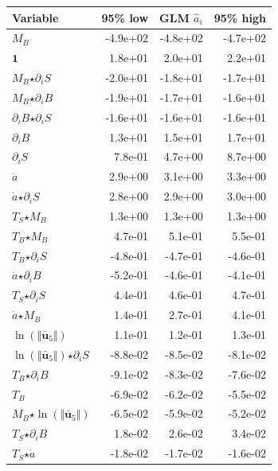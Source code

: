 
\begin{table}[H]
\centering
\begin{tabular}{l|r|r|r}
  \textbf{Variable} & \textbf{95\% low} & \textbf{GLM} $\hat{a}_i$ & \textbf{95\% high} \\
  \hline
  $M_B$ & -4.9e+02 & -4.8e+02 & -4.7e+02 \\
  $\mathbf{1}$ & 1.8e+01 & 2.0e+01 & 2.2e+01 \\
  $M_B$$ \star $$\partial_i S$ & -2.0e+01 & -1.8e+01 & -1.7e+01 \\
  $M_B$$ \star $$\partial_i B$ & -1.9e+01 & -1.7e+01 & -1.6e+01 \\
  $\partial_i B$$ \star $$\partial_i S$ & -1.6e+01 & -1.6e+01 & -1.6e+01 \\
  $\partial_i B$ & 1.3e+01 & 1.5e+01 & 1.7e+01 \\
  $\partial_i S$ & 7.8e-01 & 4.7e+00 & 8.7e+00 \\
  $\dot{a}$ & 2.9e+00 & 3.1e+00 & 3.3e+00 \\
  $\dot{a}$$ \star $$\partial_i S$ & 2.8e+00 & 2.9e+00 & 3.0e+00 \\
  $T_S$$ \star $$M_B$ & 1.3e+00 & 1.3e+00 & 1.3e+00 \\
  $T_B$$ \star $$M_B$ & 4.7e-01 & 5.1e-01 & 5.5e-01 \\
  $T_B$$ \star $$\partial_i S$ & -4.8e-01 & -4.7e-01 & -4.6e-01 \\
  $\dot{a}$$ \star $$\partial_i B$ & -5.2e-01 & -4.6e-01 & -4.1e-01 \\
  $T_S$$ \star $$\partial_i S$ & 4.4e-01 & 4.6e-01 & 4.7e-01 \\
  $\dot{a}$$ \star $$M_B$ & 1.4e-01 & 2.7e-01 & 4.1e-01 \\
  $\ln\left( \Vert \bar{\mathbf{u}}_{5} \Vert \right)$ & 1.1e-01 & 1.2e-01 & 1.3e-01 \\
  $\ln\left( \Vert \bar{\mathbf{u}}_{5} \Vert \right)$$ \star $$\partial_i S$ & -8.8e-02 & -8.5e-02 & -8.1e-02 \\
  $T_B$$ \star $$\partial_i B$ & -9.1e-02 & -8.3e-02 & -7.6e-02 \\
  $T_B$ & -6.9e-02 & -6.2e-02 & -5.5e-02 \\
  $M_B$$ \star $$\ln\left( \Vert \bar{\mathbf{u}}_{5} \Vert \right)$ & -6.5e-02 & -5.9e-02 & -5.2e-02 \\
  $T_S$$ \star $$\partial_i B$ & 1.8e-02 & 2.6e-02 & 3.4e-02 \\
  $T_S$$ \star $$\dot{a}$ & -1.8e-02 & -1.7e-02 & -1.6e-02 \\

\end{tabular}
\end{table}
